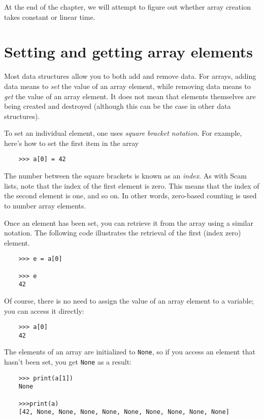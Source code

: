 At the end of the chapter, we will attempt to figure out whether
array creation takes constant or linear time.

\section{Setting and getting array elements}

Most data structures allow you to both add and remove data.
For arrays, adding data means to {\it set} the value of an array element,
while removing data means to {\it get} the value of an array element.
It does not mean that elements themselves are being created and
destroyed (although this can be the case in other data structures).

To set an individual element, one uses {\it square bracket notation}.
For example, here's how to set the
first item in the array

\begin{verbatim}
    >>> a[0] = 42
\end{verbatim}

The number between the square brackets is known as an
{\it index}.
As with Scam lists, note that the index of the first element is zero.
This means
that the index
of the second element is one, and so on.
In other words, zero-based counting is used to
number array elements.

Once an element has been set, you can retrieve it from the array
using a similar notation. The following code illustrates the
retrieval of the first (index zero) element.

\begin{verbatim}
    >>> e = a[0]

    >>> e
    42
\end{verbatim}

Of course, there is no need to assign the value of an array
element to a variable; you can access it directly:

\begin{verbatim}
    >>> a[0]
    42
\end{verbatim}

The elements of an array are initialized to \verb!None!, so if you
access an element that hasn't been set, you get \verb!None! as a
result:

\begin{verbatim}
    >>> print(a[1])
    None

    >>>print(a)
    [42, None, None, None, None, None, None, None, None, None]
\end{verbatim}

